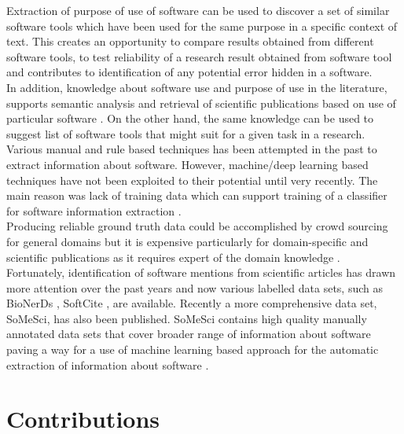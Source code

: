 Extraction of purpose of use of  software can be used to discover a set of similar software tools which have been used for the same purpose in a specific context of text. This creates an opportunity to compare results obtained from different software tools, to test reliability of a research result obtained from software tool and contributes to identification of any potential error hidden in a software.  \\

In addition, knowledge about software use and purpose of use in the literature, supports semantic analysis and retrieval of scientific publications based on use of particular software \citep{schindler2019annotation}. On the other hand, the same knowledge can be used to suggest list of software tools that might suit for a given task in a research. \\


Various manual and rule based techniques has been attempted in the past to extract information about software. However, machine/deep learning based techniques have not been exploited to their potential until very recently. The main reason was lack of training data which can support training of a classifier for software information extraction \citep{schindler2021somesci}. \\

Producing reliable ground truth data could be accomplished by crowd sourcing for general domains but it is expensive particularly for domain-specific and scientific publications as it requires expert of the domain knowledge \citep{beltagy2019scibert}.\\


Fortunately, identification of software mentions from scientific articles has drawn more attention over the past years and now various labelled data sets, such as BioNerDs \citep{duck2013bionerds} , SoftCite \citep{du2021softcite}, are available. Recently a more comprehensive data set, SoMeSci, has also been published.  SoMeSci contains high quality manually annotated data sets that cover broader range of information about software paving a way for a use of machine learning based approach for the automatic extraction of information about software \citep{schindler2021somesci}. 


\section{Contributions }
\label{sec:intro:Contributions}

